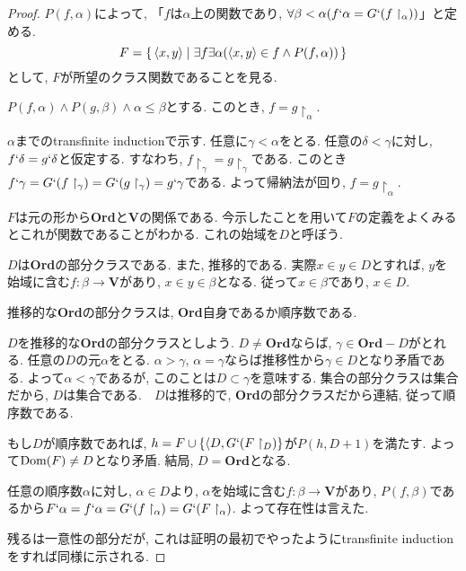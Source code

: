 \documentclass[a4paper, twoside]{bxjsarticle}
\theoremstyle{definition}
\begin{document}
    \begin{proof}
        $P(f, \alpha)$によって, 「$f$は$\alpha$上の関数であり, $\forall \beta<\alpha(f`\alpha = G`(f\restriction_\alpha))$」と定める. \[F=\set{\langle x, y\rangle| \exists f \exists \alpha (\langle x, y\rangle \in f \land P(f, \alpha))}\]として, $F$が所望のクラス関数であることを見る.
        
        $P(f, \alpha)\land P(g, \beta) \land \alpha\leq\beta$とする. このとき, $f=g\restriction_\alpha$.
        \begin{framed}
            $\alpha$までのtransfinite inductionで示す. 任意に$\gamma<\alpha$をとる. 任意の$\delta<\gamma$に対し, $f`\delta = g`\delta$と仮定する. すなわち, $f\restriction_\gamma = g\restriction_\gamma$である. このとき$f`\gamma = G`(f\restriction_\gamma) = G`(g\restriction_\gamma) = g`\gamma$である. よって帰納法が回り, $f=g\restriction_\alpha$.
        \end{framed}
        
        $F$は元の形から\textbf{Ord}と\textbf{V}の関係である. 今示したことを用いて$F$の定義をよくみるとこれが関数であることがわかる. これの始域を$D$と呼ぼう.
        
        $D$は\textbf{Ord}の部分クラスである. また, 推移的である. 実際$x\in y\in D$とすれば, $y$を始域に含む$f\colon \beta\to\textbf{V}$があり, $x\in y\in \beta$となる. 従って$x\in\beta$であり, $x\in D$. 
        
        推移的な\textbf{Ord}の部分クラスは, \textbf{Ord}自身であるか順序数である. 
        \begin{framed}
            $D$を推移的な\textbf{Ord}の部分クラスとしよう. $D\neq\textbf{Ord}$ならば, $\gamma\in\textbf{Ord}-D$がとれる. 任意の$D$の元$\alpha$をとる. $\alpha>\gamma$, $\alpha=\gamma$ならば推移性から$\gamma\in D$となり矛盾である. よって$\alpha<\gamma$であるが, このことは$D\subset\gamma$を意味する. 集合の部分クラスは集合だから, $D$は集合である.　$D$は推移的で, \textbf{Ord}の部分クラスだから連結, 従って順序数である.
        \end{framed}
        もし$D$が順序数であれば, $h = F\cup\{\langle D, G`(F\restriction_D)\}$が$P(h, D+1)$を満たす. よって${\rm Dom}(F)\neq D$となり矛盾. 結局, $D=\textbf{Ord}$となる.
        
        任意の順序数$\alpha$に対し, $\alpha\in D$より, $\alpha$を始域に含む$f\colon \beta\to\textbf{V}$があり, $P(f, \beta)$であるから$F`\alpha= f`\alpha = G`(f\restriction_\alpha) = G`(F\restriction_\alpha)$. よって存在性は言えた.
        
        残るは一意性の部分だが, これは証明の最初でやったようにtransfinite inductionをすれば同様に示される.
    \end{proof}
\end{document}

